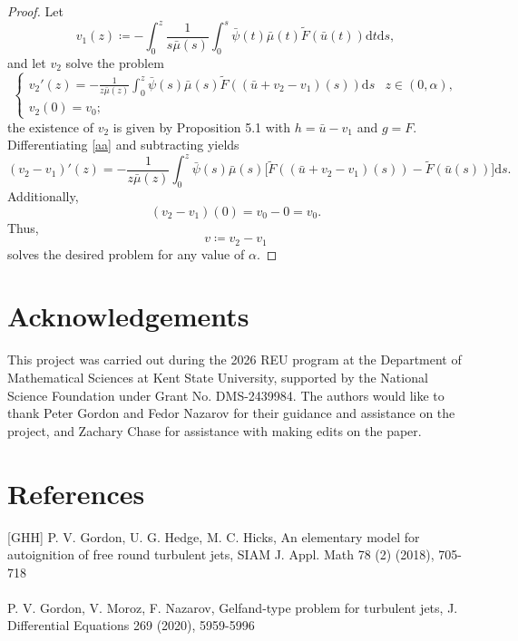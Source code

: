 \documentclass{article}
\begin{document}
    \begin{proof}
        Let
    \begin{equation}\label{aa}
        v_1(z) \coloneqq  -\int_0^z\frac 1{s\bar\mu(s)}\int_0^s\bar\psi(t)\bar\mu(t)\widetilde F(\bar u(t))\mathrm{d}t \mathrm{d}s,
    \end{equation}
    and let $v_2$ solve the problem
    \[\begin{cases}
        v_2'(z) = -\frac 1{z\bar\mu(z)}\int_0^z \bar\psi(s)\bar\mu(s)\widetilde F((\bar u + v_2 - v_1)(s))\mathrm{d}s & z\in(0,\alpha), \\
        v_2(0) = v_0;
    \end{cases}\]
    the existence of $v_2$ is given by Proposition 5.1 with $h = \bar u - v_1$ and $g=F$. Differentiating \eqref{aa} and subtracting yields
    \[(v_2-v_1)'(z) = -\frac 1{z\bar\mu(z)}\int_0^z\bar\psi(s)\bar\mu(s)\bigl[\widetilde F((\bar u + v_2 - v_1)(s)) - \widetilde F(\bar u(s))\bigr]\mathrm{d}s.\]
    Additionally, 
    \[(v_2 - v_1)(0) = v_0 - 0 = v_0.\]
    Thus,
    \[v \coloneqq  v_2 - v_1\]
    solves the desired problem for any value of $\alpha$.
    \end{proof}
    \section{Acknowledgements}
    This project was carried out during the 2026 REU program at the Department of Mathematical Sciences at Kent State University, supported by the National Science Foundation under Grant No. DMS-2439984. The authors would like to thank Peter Gordon and Fedor Nazarov for their guidance and assistance on the project, and Zachary Chase for assistance with making edits on the paper.
    \section{References}
    [GHH] P. V. Gordon, U. G. Hedge, M. C. Hicks, An elementary model for autoignition of free round turbulent jets, SIAM J. Appl. Math 78 (2) (2018), 705-718
    \\ \\
    \noindent [GMN] P. V. Gordon, V. Moroz, F. Nazarov, Gelfand-type problem for turbulent jets, J. Differential Equations 269 (2020), 5959-5996
\end{document}
